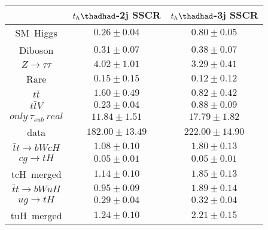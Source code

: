 \centering
\begin{tabular}{ccc} \toprule\toprule
& $t_{h}\thadhad$-2j SSCR  & $t_{h}\thadhad$-3j SSCR\\ \midrule
SM~Higgs                & $0.26\pm0.04$                        & $0.80\pm0.05$\\
Diboson                 & $0.31\pm0.07$                        & $0.38\pm0.07$\\
$Z\to\tau\tau$          & $4.02\pm1.01$                        & $3.29\pm0.41$\\
Rare                    & $0.15\pm0.15$                        & $0.12\pm0.12$\\
$t\bar{t}$              & $1.60\pm0.49$                        & $0.82\pm0.42$\\
$t\bar{t}V$             & $0.23\pm0.04$                        & $0.88\pm0.09$\\
$only~\tau_{sub}~real$  & $11.84\pm1.51$                       & $17.79\pm1.82$\\
data                    & $182.00\pm13.49$                     & $222.00\pm14.90$\\
$\bar{t}t\to bWcH$      & $1.08\pm0.10$                        & $1.80\pm0.13$\\
$cg\to tH$              & $0.05\pm0.01$                        & $0.05\pm0.01$\\
tcH~merged              & $1.14\pm0.10$                        & $1.85\pm0.13$\\
$\bar{t}t\to bWuH$      & $0.95\pm0.09$                        & $1.89\pm0.14$\\
$ug\to tH$              & $0.29\pm0.04$                        & $0.32\pm0.04$\\
tuH~merged              & $1.24\pm0.10$                        & $2.21\pm0.15$\\
\bottomrule\bottomrule
\end{tabular}